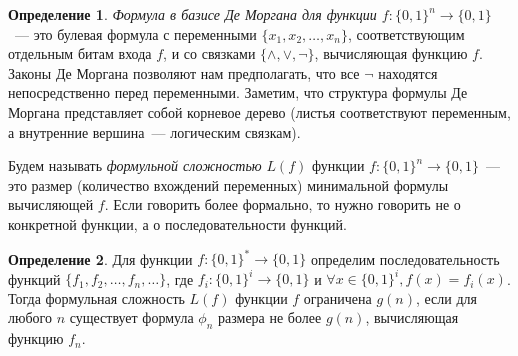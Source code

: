 \documentclass[12pt]{article}
\newcommand{\bits}{\{0,1\}}
\newcommand{\bitstr}{\bits^*}
\newcommand{\seqn}[2]{{#1}_1,{#1}_2,\dotsc,{#1}_{#2}}
\theoremstyle{definition}
\newtheorem{definition}{Определение}[section]
\theoremstyle{plain}
\theoremstyle{remark}
\begin{document}
\begin{definition}
    \emph{Формула в базисе Де Моргана для функции $f:\{0,1\}^n \to \{0,1\}$}~--- это булевая 
    формула с переменными $\{\seqn{x}{n}\}$, соответствующим отдельным битам входа $f$,
    и со связками $\{\land, \lor, \neg\}$, вычисляющая функцию $f$.
    Законы Де Моргана позволяют нам предполагать, что все $\neg$ находятся непосредственно
    перед переменными. Заметим, что структура формулы Де Моргана представляет собой корневое дерево
    (листья соответствуют переменным, а внутренние вершина~--- логическим связкам).
\end{definition}

Будем называть \emph{формульной сложностью} $L(f)$ функции $f : \{0,1\}^n \to \{0,1\}$~---
это размер (количество вхождений переменных) минимальной формулы вычисляющей $f$. Если
говорить более формально, то нужно говорить не о конкретной функции, а о последовательности
функций.

\begin{definition}
    Для функции $f:\bitstr\to\{0,1\}$ определим последовательность функций $\{\seqn{f}{n},\dotsc\}$,
    где $f_i: \{0,1\}^i\to\{0,1\}$ и $\forall x\in\{0,1\}^i, f(x) = f_i(x)$. Тогда формульная сложность
    $L(f)$ функции $f$ ограничена $g(n)$, если для любого $n$ существует формула $\phi_n$ размера
    не более $g(n)$, вычисляющая функцию $f_n$.
\end{definition}
\end{document}
